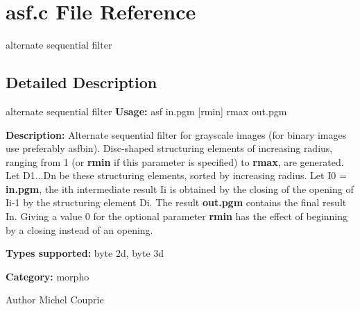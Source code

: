\section{asf.c File Reference}
\label{asf_8c}


alternate sequential filter  




\subsection{Detailed Description}
alternate sequential filter {\bfseries Usage:} asf in.pgm [rmin] rmax out.pgm

{\bfseries Description:} Alternate sequential filter for grayscale images (for binary images use preferably asfbin). Disc-\/shaped structuring elements of increasing radius, ranging from 1 (or {\bfseries rmin} if this parameter is specified) to {\bfseries rmax}, are generated. Let D1...Dn be these structuring elements, sorted by increasing radius. Let I0 = {\bfseries in.pgm}, the ith intermediate result Ii is obtained by the closing of the opening of Ii-\/1 by the structuring element Di. The result {\bfseries out.pgm} contains the final result In. Giving a value 0 for the optional parameter {\bfseries rmin} has the effect of beginning by a closing instead of an opening.

{\bfseries Types supported:} byte 2d, byte 3d

{\bfseries Category:} morpho

\begin{DoxyAuthor}{Author}
Michel Couprie 
\end{DoxyAuthor}
